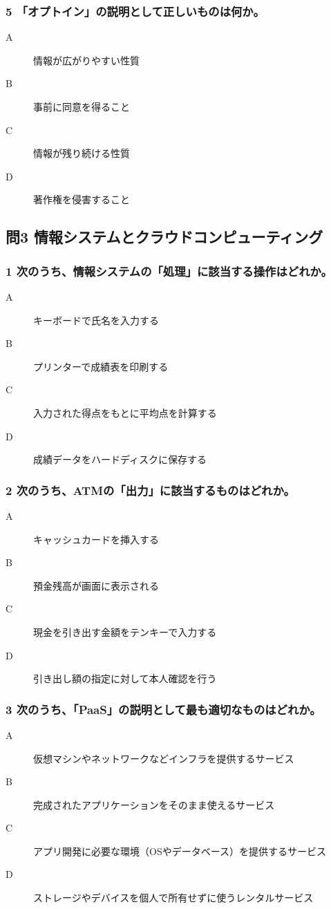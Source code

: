 \documentclass[a4paper,6pt]{jsarticle}
\begin{document}
\subsubsection*{5 「オプトイン」の説明として正しいものは何か。}
\begin{description}
  \item[A] 情報が広がりやすい性質
  \item[B] 事前に同意を得ること
  \item[C] 情報が残り続ける性質
  \item[D] 著作権を侵害すること
\end{description}

\newpage
\vspace{-5mm}
\subsection*{問3 情報システムとクラウドコンピューティング}

\subsubsection*{1 次のうち、情報システムの「処理」に該当する操作はどれか。}
\begin{description}
  \item[A] キーボードで氏名を入力する
  \item[B] プリンターで成績表を印刷する
  \item[C] 入力された得点をもとに平均点を計算する
  \item[D] 成績データをハードディスクに保存する
\end{description}

\subsubsection*{2 次のうち、ATMの「出力」に該当するものはどれか。}
\begin{description}
  \item[A] キャッシュカードを挿入する
  \item[B] 預金残高が画面に表示される
  \item[C] 現金を引き出す金額をテンキーで入力する
  \item[D] 引き出し額の指定に対して本人確認を行う
\end{description}

\subsubsection*{3 次のうち、「PaaS」の説明として最も適切なものはどれか。}
\begin{description}
  \item[A] 仮想マシンやネットワークなどインフラを提供するサービス
  \item[B] 完成されたアプリケーションをそのまま使えるサービス
  \item[C] アプリ開発に必要な環境（OSやデータベース）を提供するサービス
  \item[D] ストレージやデバイスを個人で所有せずに使うレンタルサービス
\end{description}
\end{document}
